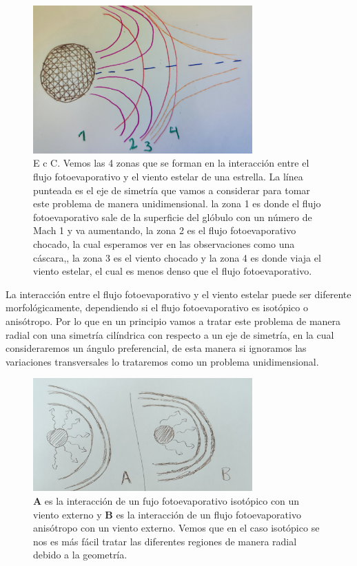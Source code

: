 \documentclass{book}
\begin{document}
\begin{figure}[h]
    \centering
    \includegraphics[width=0.75\textwidth]{Chp2_Zone.jpg}
    \caption{E c C.
    Vemos las 4 zonas que se forman en la interacción entre el flujo fotoevaporativo y el viento estelar de una estrella. La línea punteada es el eje de simetría que vamos a considerar para tomar este problema de manera unidimensional. la zona 1 es donde el flujo fotoevaporativo sale de la superficie del glóbulo con un número de Mach 1 y va aumentando, la zona 2 es el flujo fotoevaporativo chocado, la cual esperamos ver en las observaciones como una cáscara,, la zona 3 es el viento chocado y la zona 4 es donde viaja el viento estelar, el cual es menos denso que el flujo fotoevaporativo.}
    \label{fig:zones}
\end{figure}

La interacción entre el flujo fotoevaporativo y el viento estelar puede ser diferente morfológicamente, dependiendo si el flujo fotoevaporativo es isotópico o anisótropo. Por lo que en un principio vamos a tratar este problema de manera radial con una simetría cilíndrica con respecto a un eje de simetría, en la cual consideraremos un ángulo preferencial, de esta manera si ignoramos las variaciones transversales lo trataremos como un problema unidimensional.

\begin{figure}[h]
    \centering
    \includegraphics[width=0.75\textwidth]{Chp2_iso&ans.jpg}
    \caption{\textbf{A} es la interacción de un fujo fotoevaporativo isotópico con un viento externo y \textbf{B} es la interacción de un flujo fotoevaporativo anisótropo con un viento externo. Vemos que en el caso isotópico se nos es más fácil tratar las diferentes regiones de manera radial debido a la geometría.}
    \label{fig:isotyaniso}
\end{figure}
\end{document}
